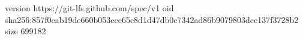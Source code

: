 version https://git-lfs.github.com/spec/v1
oid sha256:857f0cab19de660b053ecc65c8d1d47db0c7342ad86b9079803dcc137f3728b2
size 699182
